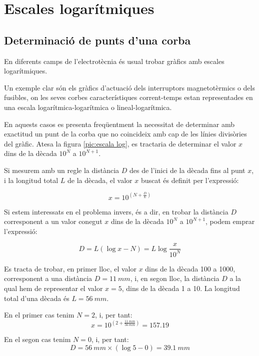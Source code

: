 \section{Escales logarítmiques}\label{sec:escales-log} 

\subsection{Determinació de punts d'una corba}

En diferents camps de l'electrotècnia és usual trobar gràfics amb escales
logarítmiques.

Un exemple clar són els gràfics d'actuació dels interruptors magnetotèrmics o dels
fusibles, on les seves corbes característiques corrent-temps estan representades en
una escala logarítmica-logarítmica o lineal-logarítmica.

En aquests casos es presenta freqüentment la necessitat de determinar amb exactitud un
punt de la corba que no coincideix amb cap de les línies divisòries del gràfic. Atesa
la figura \vref{pic:escala log}, es tractaria de determinar el valor $x$ dins de la dècada
$10^N$ a $10^{N+1}$.

\begin{center}
    
    \label{pic:escala log}
\end{center}

Si mesurem amb un regle la distància $D$ des de l'inici de la dècada fins al punt $x$, i
la longitud total $L$ de la dècada, el valor $x$ buscat és definit per l'expressió:

\begin{equation}
    x = 10^{\left(N+\frac{D}{L}\right)}
\end{equation}

Si estem interessats en el problema invers, és a dir, en  trobar la distància $D$
corresponent a un valor conegut $x$ dins de la dècada $10^N$ a $10^{N+1}$, podem emprar
l'expressió:

\begin{equation}
    D = L(\log x - N) = L \log\frac{x}{10^N}
\end{equation}

	
\begin{exemple}[\ValorsEscalaLog{}]
	\addcontentsxms{\ValorsEscalaLog}
    Es tracta de trobar, en primer lloc, el valor $x$ dins de la dècada 100 a 1000, corresponent a una
    distància $D=\qty{11}{mm}$, i, en segon lloc, la distància $D$ a la qual hem de representar el valor $x=5$, dins de la
    dècada 1 a 10. La longitud total d'una dècada és $L=\qty{56}{mm}$.

    En el primer cas tenim $N=2$, i, per tant:
    \[
        x = 10^{\left(2+\frac{\qty{11}{mm}}{\qty{56}{mm}}\right)}= \num{157,19}
    \]

    En el segon cas tenim $N=0$, i, per tant:
    \[
        D = \qty{56}{mm} \times (\log 5 - 0)  = \qty{39,1}{mm}
    \]

\end{exemple}

